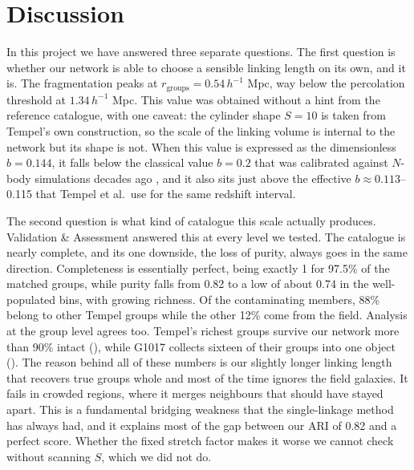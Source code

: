 \documentclass[9pt,a4paper,twocolumn,twoside]{rho-class/rho}
\begin{document}
\section{Discussion}\label{sec:discussion}

In this project we have answered three separate
questions. The first question is whether our network is able to choose a sensible
linking length on its own, and it is. The fragmentation peaks at
$r_{\mathrm{groups}} = 0.54\,h^{-1}$ Mpc, way below the percolation
threshold at $1.34\,h^{-1}$ Mpc. This value was obtained without
a hint from the reference catalogue, with one caveat: the cylinder
shape $S = 10$ is taken from Tempel's own construction, so the scale of the
linking volume is internal to the network but its shape is not.
When this value is expressed as the dimensionless $b = 0.144$,
it falls below the classical value $b = 0.2$ that was calibrated
against $N$-body simulations decades ago \cite{davis1985, berlind2002}, and
it also sits just above the effective $b \approx 0.113$--0.115 that Tempel et
al.\ use for the same redshift interval.

The second question is what kind of catalogue this scale actually
produces. Validation \& Assessment answered this at every level we tested. The catalogue
is nearly complete, and its one downside, the loss of purity, always goes
in the same direction.
Completeness is essentially perfect, being exactly 1 for 97.5\% of the
matched groups, while purity falls from 0.82 to a low of about 0.74 in the
well-populated bins, with growing richness.
Of the contaminating members, 88\% belong to other Tempel groups while the other
12\% come from the field. Analysis at the group level agrees too.
Tempel's richest groups survive our network more than 90\% intact
(), while G1017 collects sixteen of their
groups into one object (). The reason
behind all of these numbers is our slightly longer linking length that recovers
true groups whole and most of the time ignores the field galaxies. It fails in crowded
regions, where it merges neighbours that should have stayed apart. This is a fundamental
bridging weakness that the single-linkage method has always had, and it explains most of the gap between
our ARI of 0.82 and a perfect score. Whether the fixed stretch factor makes
it worse we cannot check without scanning $S$, which we did not do.
\end{document}
